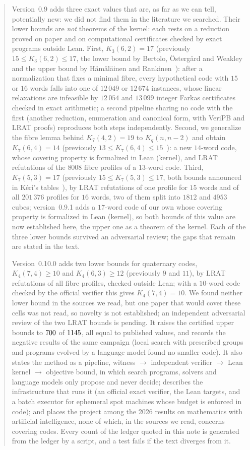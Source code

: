 \documentclass[11pt]{amsart}
\theoremstyle{definition}
\theoremstyle{remark}
\begin{document}
\begin{abstract}
Version~0.9 adds three exact values that are, as far as we can tell, potentially new: we did not find them in the literature we searched.
Their lower bounds are \emph{not} theorems of the kernel: each rests on a reduction proved on paper and on computational certificates checked by exact programs outside Lean.
First, $K_3(6,2)=17$ (previously $15\le K_3(6,2)\le 17$, the lower bound by Bertolo, Östergård and Weakley~\cite{bow2004} and the upper bound by Hämäläinen and Rankinen~\cite{hr1991}): after a normalization that fixes a minimal fibre, every hypothetical code with $15$ or $16$ words falls into one of $12\,049$ or $12\,674$ instances, whose linear relaxations are infeasible by $12\,054$ and $13\,099$ integer Farkas certificates checked in exact arithmetic; a second pipeline sharing no code with the first (another reduction, enumeration and canonical form, with VeriPB and LRAT proofs) reproduces both steps independently.
Second, we generalize the fibre lemma behind $K_7(4,2)=19$ to $K_q(n,n-2)$ and obtain $K_7(6,4)=14$ (previously $13\le K_7(6,4)\le 15$~\cite{hsq2009,ko2005}): a new $14$-word code, whose covering property is formalized in Lean (kernel), and LRAT refutations of the $8008$ fibre profiles of a $13$-word code.
Third, $K_7(5,3)=17$ (previously $15\le K_7(5,3)\le 17$, both bounds announced in Kéri's tables~\cite{keri}), by LRAT refutations of one profile for $15$ words and of all $201\,376$ profiles for $16$ words, two of them split into $1812$ and $4953$ cubes; version~0.9.1 adds a $17$-word code of our own whose covering property is formalized in Lean (kernel), so both bounds of this value are now established here, the upper one as a theorem of the kernel.
Each of the three lower bounds survived an adversarial review; the gaps that remain are stated in the text.

Version~0.10.0 adds two lower bounds for quaternary codes, $K_4(7,4)\ge 10$ and $K_4(6,3)\ge 12$ (previously $9$ and $11$), by LRAT refutations of all fibre profiles, checked outside Lean; with a $10$-word code checked by the official verifier this gives $K_4(7,4)=10$. We found neither lower bound in the sources we read, but one paper that would cover these cells was not read, so novelty is not established; an independent adversarial review of the two LRAT bounds is pending. It raises the certified upper bounds to $\NumUBKernel$ of $\NumCelulas$, all equal to published values, and records the negative results of the same campaign (local search with prescribed groups and programs evolved by a language model found no smaller code).
It also states the method as a pipeline, witness $\to$ independent verifier $\to$ Lean kernel $\to$ objective bound, in which search programs, solvers and language models only propose and never decide; describes the infrastructure that runs it (an official exact verifier, the Lean targets, and a batch executor for ephemeral spot machines whose budget is enforced in code); and places the project among the 2026 results on mathematics with artificial intelligence, none of which, in the sources we read, concerns covering codes.
Every count of the ledger quoted in this note is generated from the ledger by a script, and a test fails if the text diverges from it.
\end{abstract}
\end{document}
